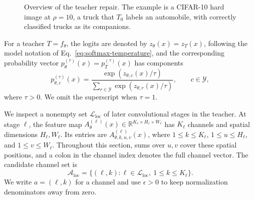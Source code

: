 \documentclass[review,number,sort&compress]{elsarticle}
\theoremstyle{definition}
\begin{document}
\begin{figure}[!b]
{}
\caption{Overview of the teacher repair. The example is a CIFAR-10 hard
image at $\rho=10$, a truck that $T_0$ labels an automobile, with correctly
classified trucks as its companions.}
\label{fig:repair-flow}
\end{figure}

For a teacher $T=f_\theta$, the logits are denoted by
$z_\theta(x)=z_T(x)$, following the model notation of
Eq.~\eqref{eq:softmax-temperature}, and the corresponding
probability vector $p_\theta^{(\tau)}(x)=p_T^{(\tau)}(x)$ has
components
\begin{equation}
\label{eq:repair-probabilities}
p_{\theta,c}^{(\tau)}(x)=
\frac{\exp(z_{\theta,c}(x)/\tau)}
{\sum_{r\in\mathcal{Y}}\exp(z_{\theta,r}(x)/\tau)},
\qquad c\in\mathcal{Y},
\end{equation}
where $\tau>0$. We omit the superscript when $\tau=1$.

We inspect a nonempty set $\mathcal{L}_{\mathrm{loc}}$ of
later convolutional stages in the teacher. At stage $\ell$,
the feature map
$A_\theta^{(\ell)}(x)\in
\mathbb{R}^{K_\ell\times H_\ell\times W_\ell}$
has $K_\ell$ channels and spatial dimensions $H_\ell,W_\ell$.
Its entries are $A_{\theta,k,u,v}^{(\ell)}(x)$, where
$1\leq k\leq K_\ell$, $1\leq u\leq H_\ell$, and
$1\leq v\leq W_\ell$. Throughout this section, sums over
$u,v$ cover these spatial positions, and a colon in the
channel index denotes the full channel vector.
The candidate channel set is
\begin{equation}
\mathcal{A}_{\mathrm{loc}}=
\{(\ell,k):\ell\in\mathcal{L}_{\mathrm{loc}},
                  \ 1\leq k\leq K_\ell\}.
\end{equation}
We write $a=(\ell,k)$ for a channel and use $\epsilon>0$
to keep normalization denominators away from zero.
\end{document}
